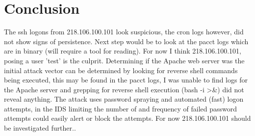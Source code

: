 \documentclass[
	letterpaper, %
	10pt, %
	unnumberedsections, %
	twoside, %
]{APAAssignment}
\begin{document}
\section{Conclusion}
The ssh logons from 218.106.100.101 look suspicious, the cron logs however, did not show signs of persistence. Next step would be to look at the pacct logs which are in binary (will require a tool for reading). For now I think 218.106.100.101, posing a user 'test' is the culprit. Determining if the Apache web server was the initial attack vector can be determined by looking for reverse shell commands being executed, this may be found in the pacct logs, I was unable to find logs for the Apache server and grepping for reverse shell execution (bash -i >\&) did not reveal anything. The attack uses password spraying and automated (fast) logon attempts, in the IDS limiting the number of and frequency of failed password attempts could easily alert or block the attempts. For now 218.106.100.101 should be investigated further..



\printbibliography %




%


\clearpage
\end{document}
